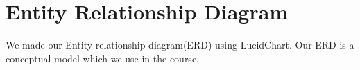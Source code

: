 \documentclass{scrreprt}
\begin{document}
\chapter{Entity Relationship Diagram}
We made our Entity relationship diagram(ERD) using LucidChart. Our ERD is a conceptual model which we use in the course.\\\\\\\\
\begin{center}
\end{center}
\end{document}
